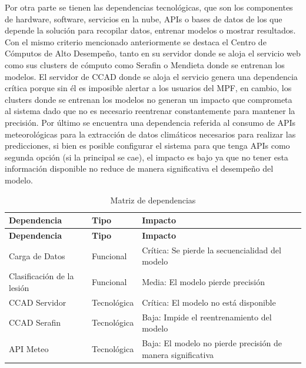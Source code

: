 Por otra parte se tienen las dependencias tecnológicas, que son los componentes de hardware, software, servicios en la nube, APIs o bases de datos de los que depende la solución para recopilar datos, entrenar modelos o mostrar resultados. Con el mismo criterio mencionado anteriormente se destaca el Centro de Cómputos de Alto Desempeño, tanto en su servidor donde se aloja el servicio web como sus clusters de cómputo como Serafin o Mendieta donde se entrenan los modelos. El servidor de CCAD donde se aloja el servicio genera una dependencia crítica porque sin él es imposible alertar a los usuarios del MPF, en cambio, los clusters donde se entrenan los modelos no generan un impacto que comprometa al sistema dado que no es necesario reentrenar constantemente para mantener la precisión. Por último se encuentra una dependencia referida al consumo de APIs meteorológicas para la extracción de datos climáticos necesarios para realizar las predicciones, si bien es posible configurar el sistema para que tenga APIs como segunda opción (si la principal se cae), el impacto es bajo ya que no tener esta información disponible no reduce de manera significativa el desempeño del modelo.

\begin{longtable}[]{@{}
>{\raggedright\arraybackslash}p{}
  >{\raggedright\arraybackslash}p{}
  >{\raggedright\arraybackslash}p{}@{}}
\caption{Matriz de dependencias}
\label{tab:matriz-de-dependencias}\\
\toprule\noalign{}
\textbf{Dependencia} & \textbf{Tipo} & \textbf{Impacto} \\
\midrule\noalign{}
\endfirsthead
\toprule\noalign{}
\textbf{Dependencia} & \textbf{Tipo} & \textbf{Impacto} \\
\midrule\noalign{}
\endhead
\bottomrule\noalign{}
\endlastfoot
Carga de Datos & Funcional & Crítica: Se pierde la secuencialidad del modelo \\
Clasificación de la lesión & Funcional & Media: El modelo pierde precisión \\
CCAD Servidor & Tecnológica & Crítica: El modelo no está disponible \\
CCAD Serafin & Tecnológica & Baja: Impide el reentrenamiento del modelo \\
API Meteo & Tecnológica & Baja: El modelo no pierde precisión de manera significativa \\
\end{longtable}

